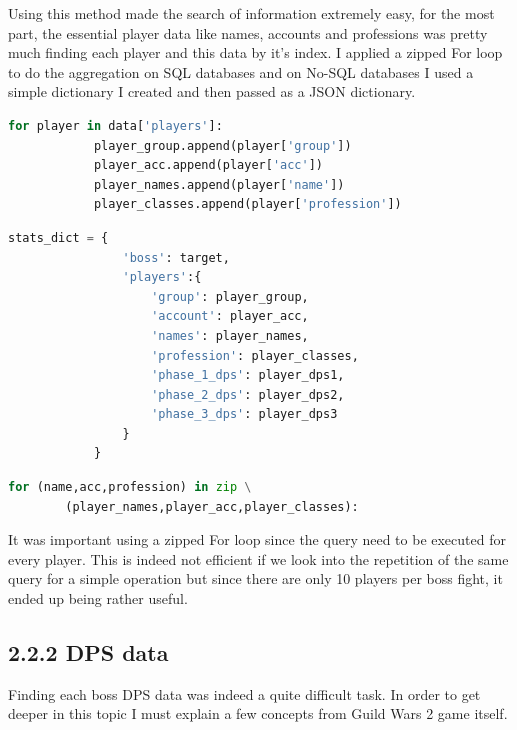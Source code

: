\documentclass[12pt,a4paper]{article}
\begin{document}
    \newpage

    Using this method made the search of information extremely easy, for the most part, the essential
    player data like names, accounts and professions was pretty much finding each player and this data
    by it's index. I applied a zipped For loop to do the aggregation on SQL databases and on No-SQL databases
    I used a simple dictionary I created and then passed as a JSON dictionary.\\

    \begin{lstlisting}[language=Python, caption={\textbf{Basic player data loop}},captionpos=!b]
        for player in data['players']:
            player_group.append(player['group'])
            player_acc.append(player['acc'])
            player_names.append(player['name'])
            player_classes.append(player['profession'])
    \end{lstlisting}
    \begin{lstlisting}[language=Python, caption={\textbf{Custom Python stat dictionary}},captionpos=!b]
        stats_dict = {
                'boss': target,
                'players':{
                    'group': player_group,
                    'account': player_acc,
                    'names': player_names,
                    'profession': player_classes,
                    'phase_1_dps': player_dps1,
                    'phase_2_dps': player_dps2,
                    'phase_3_dps': player_dps3
                }
            }
    \end{lstlisting}
    
    \begin{lstlisting}[language=Python, caption={\textbf{Zipped data for SQLite query}},captionpos=!b]
        for (name,acc,profession) in zip \
        (player_names,player_acc,player_classes):
    \end{lstlisting}

    It was important using a zipped For loop since the query need to be executed for every player.
    This is indeed not efficient if we look into the repetition of the same query for a simple operation
    but since there are only 10 players per boss fight, it ended up being rather useful.

    \newpage

    \subsection*{\normalsize 2.2.2 DPS data}
    Finding each boss DPS data was indeed a quite difficult task. In order to get deeper in this topic
    I must explain a few concepts from Guild Wars 2 game itself.
\end{document}
